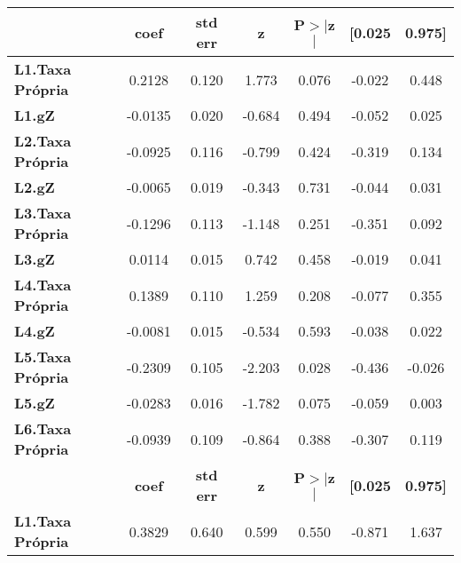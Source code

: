 \begin{center}
\begin{tabular}{lcccccc}
\toprule
                         & \textbf{coef} & \textbf{std err} & \textbf{z} & \textbf{P$> |$z$|$} & \textbf{[0.025} & \textbf{0.975]}  \\
\midrule
\textbf{L1.Taxa Própria} &       0.2128  &        0.120     &     1.773  &         0.076        &       -0.022    &        0.448     \\
\textbf{L1.gZ}           &      -0.0135  &        0.020     &    -0.684  &         0.494        &       -0.052    &        0.025     \\
\textbf{L2.Taxa Própria} &      -0.0925  &        0.116     &    -0.799  &         0.424        &       -0.319    &        0.134     \\
\textbf{L2.gZ}           &      -0.0065  &        0.019     &    -0.343  &         0.731        &       -0.044    &        0.031     \\
\textbf{L3.Taxa Própria} &      -0.1296  &        0.113     &    -1.148  &         0.251        &       -0.351    &        0.092     \\
\textbf{L3.gZ}           &       0.0114  &        0.015     &     0.742  &         0.458        &       -0.019    &        0.041     \\
\textbf{L4.Taxa Própria} &       0.1389  &        0.110     &     1.259  &         0.208        &       -0.077    &        0.355     \\
\textbf{L4.gZ}           &      -0.0081  &        0.015     &    -0.534  &         0.593        &       -0.038    &        0.022     \\
\textbf{L5.Taxa Própria} &      -0.2309  &        0.105     &    -2.203  &         0.028        &       -0.436    &       -0.026     \\
\textbf{L5.gZ}           &      -0.0283  &        0.016     &    -1.782  &         0.075        &       -0.059    &        0.003     \\
\textbf{L6.Taxa Própria} &      -0.0939  &        0.109     &    -0.864  &         0.388        &       -0.307    &        0.119     \\
                         & \textbf{coef} & \textbf{std err} & \textbf{z} & \textbf{P$> |$z$|$} & \textbf{[0.025} & \textbf{0.975]}  \\
\midrule
\textbf{L1.Taxa Própria} &       0.3829  &        0.640     &     0.599  &         0.550        &       -0.871    &        1.637     \\

\end{tabular}
\end{center}
